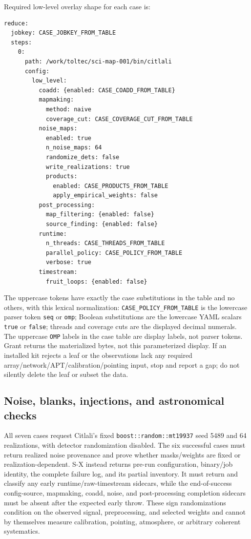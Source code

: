 \documentclass[11pt]{article}
\newcommand{\code}[1]{\nolinkurl{#1}}
\begin{document}
Required low-level overlay shape for each case is:

\begin{small}
\begin{verbatim}
reduce:
  jobkey: CASE_JOBKEY_FROM_TABLE
  steps:
    0:
      path: /work/toltec/sci-map-001/bin/citlali
      config:
        low_level:
          coadd: {enabled: CASE_COADD_FROM_TABLE}
          mapmaking:
            method: naive
            coverage_cut: CASE_COVERAGE_CUT_FROM_TABLE
          noise_maps:
            enabled: true
            n_noise_maps: 64
            randomize_dets: false
            write_realizations: true
            products:
              enabled: CASE_PRODUCTS_FROM_TABLE
              apply_empirical_weights: false
          post_processing:
            map_filtering: {enabled: false}
            source_finding: {enabled: false}
          runtime:
            n_threads: CASE_THREADS_FROM_TABLE
            parallel_policy: CASE_POLICY_FROM_TABLE
            verbose: true
          timestream:
            fruit_loops: {enabled: false}
\end{verbatim}
\end{small}

The uppercase tokens have exactly the case substitutions in the table and no
others, with this lexical normalization: \code{CASE_POLICY_FROM_TABLE} is the
lowercase parser token \code{seq} or \code{omp}; Boolean substitutions are the
lowercase YAML scalars \code{true} or \code{false}; threads and coverage cuts are
the displayed decimal numerals.  The uppercase \code{OMP} labels in the case
table are display labels, not parser tokens.  Grant returns the materialized
bytes, not this parameterized display.
If an installed kit rejects a leaf or the observations lack any required
array/network/APT/calibration/pointing input, stop and report a gap; do not
silently delete the leaf or subset the data.

\subsection*{Noise, blanks, injections, and astronomical checks}

All seven cases request Citlali's fixed \code{boost::random::mt19937} seed 5489
and 64 realizations, with detector randomization disabled.  The six successful
cases must return realized noise provenance and prove whether masks/weights are
fixed or realization-dependent.  S-X instead returns pre-run configuration,
binary/job identity, the complete failure log, and its partial inventory.  It
must return and classify any early runtime/raw-timestream sidecars, while the
end-of-success config-source, mapmaking, coadd, noise, and post-processing
completion sidecars must be absent after the expected early throw.  These
sign randomizations condition on the observed signal, preprocessing, and
selected weights and cannot by themselves measure calibration, pointing,
atmosphere, or arbitrary coherent systematics.
\end{document}
